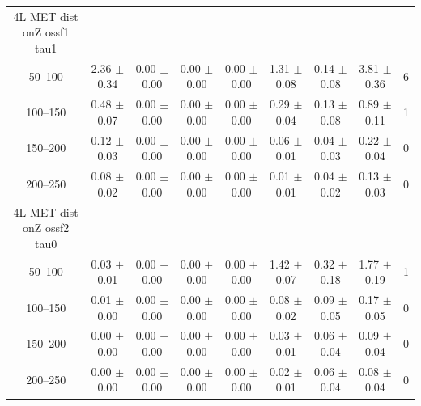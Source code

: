 \begin{table}
\begin{center}
\begin{tabular}{|c|cccccc|c|c|}
4L MET dist onZ ossf1 tau1\\
50--100 & 2.36 $\pm$ 0.34 & 0.00 $\pm$ 0.00 & 0.00 $\pm$ 0.00 & 0.00 $\pm$ 0.00 & 1.31 $\pm$ 0.08 & 0.14 $\pm$ 0.08 & 3.81 $\pm$ 0.36 & 6 \\
100--150 & 0.48 $\pm$ 0.07 & 0.00 $\pm$ 0.00 & 0.00 $\pm$ 0.00 & 0.00 $\pm$ 0.00 & 0.29 $\pm$ 0.04 & 0.13 $\pm$ 0.08 & 0.89 $\pm$ 0.11 & 1 \\
150--200 & 0.12 $\pm$ 0.03 & 0.00 $\pm$ 0.00 & 0.00 $\pm$ 0.00 & 0.00 $\pm$ 0.00 & 0.06 $\pm$ 0.01 & 0.04 $\pm$ 0.03 & 0.22 $\pm$ 0.04 & 0 \\
200--250 & 0.08 $\pm$ 0.02 & 0.00 $\pm$ 0.00 & 0.00 $\pm$ 0.00 & 0.00 $\pm$ 0.00 & 0.01 $\pm$ 0.01 & 0.04 $\pm$ 0.02 & 0.13 $\pm$ 0.03 & 0 \\
\hline
4L MET dist onZ ossf2 tau0\\
50--100 & 0.03 $\pm$ 0.01 & 0.00 $\pm$ 0.00 & 0.00 $\pm$ 0.00 & 0.00 $\pm$ 0.00 & 1.42 $\pm$ 0.07 & 0.32 $\pm$ 0.18 & 1.77 $\pm$ 0.19 & 1 \\
100--150 & 0.01 $\pm$ 0.00 & 0.00 $\pm$ 0.00 & 0.00 $\pm$ 0.00 & 0.00 $\pm$ 0.00 & 0.08 $\pm$ 0.02 & 0.09 $\pm$ 0.05 & 0.17 $\pm$ 0.05 & 0 \\
150--200 & 0.00 $\pm$ 0.00 & 0.00 $\pm$ 0.00 & 0.00 $\pm$ 0.00 & 0.00 $\pm$ 0.00 & 0.03 $\pm$ 0.01 & 0.06 $\pm$ 0.04 & 0.09 $\pm$ 0.04 & 0 \\
200--250 & 0.00 $\pm$ 0.00 & 0.00 $\pm$ 0.00 & 0.00 $\pm$ 0.00 & 0.00 $\pm$ 0.00 & 0.02 $\pm$ 0.01 & 0.06 $\pm$ 0.04 & 0.08 $\pm$ 0.04 & 0 \\
\hline
\hline
\end{tabular}
\end{center}
\end{table}